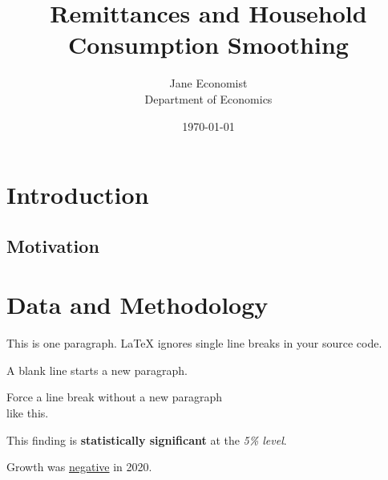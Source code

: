 \documentclass[11pt,a4paper]{article}   %
\title{Remittances and Household Consumption Smoothing}
\author{Jane Economist \\ Department of Economics}
\date{\today}
\begin{document}
\maketitle

\section{Introduction}
\subsection{Motivation}

\section{Data and Methodology}

This is one paragraph. LaTeX ignores
single line breaks in your source code.

A blank line starts a new paragraph.

Force a line break without a new paragraph \\
like this.

This finding is \textbf{statistically significant}
at the \textit{5\% level}. %

Growth was \underline{negative} in 2020.

%
\end{document}
